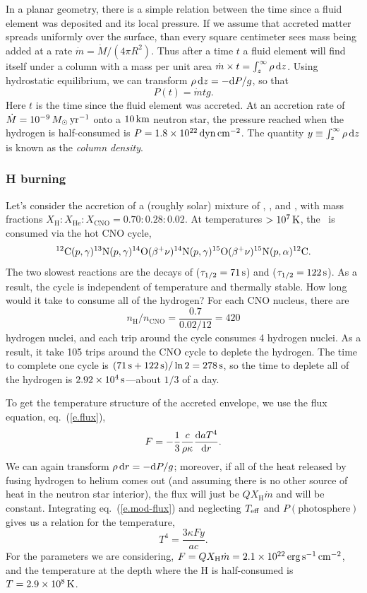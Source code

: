 In a planar geometry, there is a simple relation between the time since a fluid element was deposited and its local pressure. If we assume that accreted matter spreads uniformly over the surface, than every square centimeter sees mass being added at a rate $\dot{m} = \dot{M}/(4\pi R^{2})$.  Thus after a time $t$ a fluid element will find itself under a column with a mass per unit area $\dot{m}\times t = \int_{z}^{\infty}\rho\usp\dif z$. Using hydrostatic equilibrium, we can transform $\rho\usp\dif z = -\dif P/g$, so that
\[
P(t) = \dot{m}tg.
\]
Here $t$ is the time since the fluid element was accreted.  At an accretion rate of $\dot{M} = 10^{-9}\nsp\Msun\usp\yr^{-1}$ onto a $10\nsp\km$ neutron star, the pressure reached when the hydrogen is half-consumed is $P = 1.8\ee{22}\nsp\dyne\usp\cm^{-2}$.  The quantity $y\equiv \int_{z}^{\infty}\rho\usp\dif z$ is known as the \emph{column density}.

\subsubsection{H burning}

Let's consider the accretion of a (roughly solar) mixture of \hydrogen, \helium, and \carbon, with mass fractions $X_{\mathrm{H}}:X_{\mathrm{He}}:X_{\mathrm{CNO}} = 0.70:0.28:0.02$. At temperatures $> 10^{7}\nsp\K$, the \hydrogen\ is consumed via the hot CNO cycle,
\[
	\carbon(\pt,\gamma)\nitrogen[13](\pt,\gamma)\oxygen[14](\beta^{+}\nu)\nitrogen[14](\pt,\gamma) \oxygen[15](\beta^{+}\nu)\nitrogen[15](\pt,\alpha)\carbon.
\]
The two slowest  reactions are the decays of \oxygen[14] ($\tau_{1/2} = 71\nsp\second$) and \oxygen[15] ($\tau_{1/2} = 122\nsp\second$). As a result, the cycle is independent of temperature and thermally stable.
How long would it take to consume all of the hydrogen?  For each CNO nucleus, there are
\[ n_{\mathrm{H}}/n_{\mathrm{CNO}} = \frac{0.7}{0.02/12} = 420 \]
hydrogen nuclei, and each trip around the cycle consumes 4 hydrogen nuclei. As a result, it take 105 trips around the CNO cycle to deplete the hydrogen.  The time to complete one cycle is $(71\nsp\second + 122\nsp\second) /\ln 2 = 278\nsp\second$, so the time to deplete all of the hydrogen is $2.92\ee{4}\nsp\second$---about $1/3$ of a day.

To get the temperature structure of the accreted envelope, we use the flux equation, eq.~(\ref{e.flux}),
\begin{equation}\label{e.mod-flux}
F = -\frac{1}{3}\frac{c}{\rho\kappa}\frac{\dif aT^{4}}{\dif r}.
\end{equation}
We can again transform $\rho\usp\dif r = -\dif P/g$; moreover, if all of the heat released by fusing hydrogen to helium comes out (and assuming there is no other source of heat in the neutron star interior), the flux will just be $QX_{\mathrm{H}}\dot{m}$ and will be constant. Integrating eq.~(\ref{e.mod-flux}) and neglecting $\Teff$ and $P(\textrm{photosphere})$ gives us a relation for the temperature,
\[	T^{4} = \frac{3\kappa Fy}{ac}. \]
For the parameters we are considering, $F = QX_{\mathrm{H}}\dot{m} = 2.1\ee{22}\nsp\ergspersecond\usp\cm^{-2}$, and the temperature at the depth where the H is half-consumed is $T = 2.9\ee{8}\nsp\K$.

